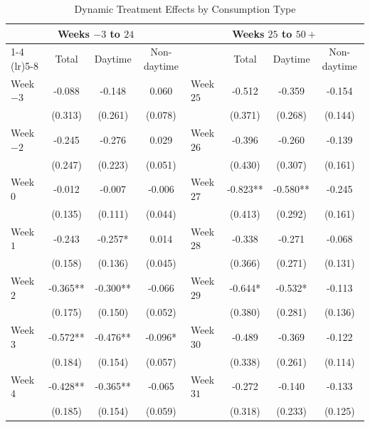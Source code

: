 \begin{table}[htbp]
\centering
\caption{Dynamic Treatment Effects by Consumption Type}
\label{tab:event_study_full}
\begin{threeparttable}
\scriptsize
\begin{tabular}{lccc lccc}
\toprule
\multicolumn{4}{c}{\textbf{Weeks $-3$ to $24$}} & \multicolumn{4}{c}{\textbf{Weeks $25$ to $50+$}} \\
\cmidrule(lr){1-4} \cmidrule(lr){5-8}
 & Total & Daytime & Non-daytime &  & Total & Daytime & Non-daytime \\
\midrule

Week $-3$ & -0.088 & -0.148 & 0.060 & Week $25$ & -0.512 & -0.359 & -0.154 \\
          & (0.313) & (0.261) & (0.078) &           & (0.371) & (0.268) & (0.144) \\

Week $-2$ & -0.245 & -0.276 & 0.029 & Week $26$ & -0.396 & -0.260 & -0.139 \\
          & (0.247) & (0.223) & (0.051) &           & (0.430) & (0.307) & (0.161) \\

Week $0$  & -0.012 & -0.007 & -0.006 & Week $27$ & -0.823** & -0.580** & -0.245 \\
          & (0.135) & (0.111) & (0.044) &           & (0.413)  & (0.292)  & (0.161) \\

Week $1$  & -0.243 & -0.257* & 0.014 & Week $28$ & -0.338 & -0.271 & -0.068 \\
          & (0.158) & (0.136) & (0.045) &           & (0.366) & (0.271) & (0.131) \\

Week $2$  & -0.365** & -0.300** & -0.066 & Week $29$ & -0.644* & -0.532* & -0.113 \\
          & (0.175)  & (0.150)  & (0.052) &           & (0.380)  & (0.281)  & (0.136) \\

Week $3$  & -0.572** & -0.476** & -0.096* & Week $30$ & -0.489 & -0.369 & -0.122 \\
          & (0.184)  & (0.154)  & (0.057) &           & (0.338) & (0.261) & (0.114) \\

Week $4$  & -0.428** & -0.365** & -0.065 & Week $31$ & -0.272 & -0.140 & -0.133 \\
          & (0.185)  & (0.154)  & (0.059) &           & (0.318) & (0.233) & (0.125) \\


\end{tabular}
\end{threeparttable}
\end{table}
